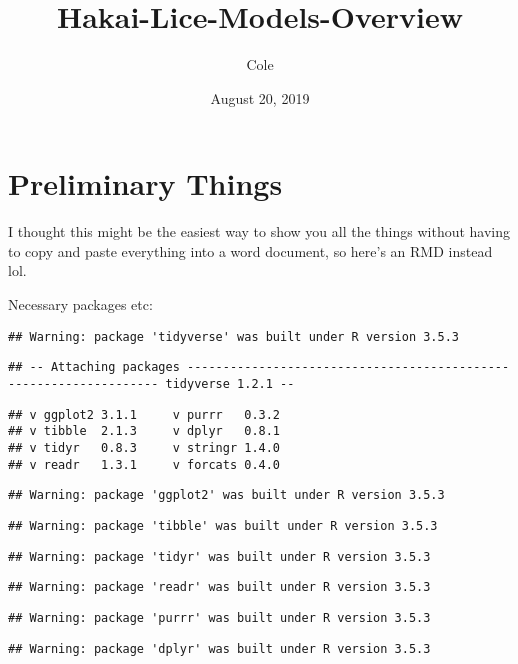 \documentclass[]{article}
\title{Hakai-Lice-Models-Overview}
\author{Cole}
\date{August 20, 2019}
\begin{document}
\maketitle

\section{Preliminary Things}\label{preliminary-things}

I thought this might be the easiest way to show you all the things
without having to copy and paste everything into a word document, so
here's an RMD instead lol.

Necessary packages etc:

\begin{verbatim}
## Warning: package 'tidyverse' was built under R version 3.5.3
\end{verbatim}

\begin{verbatim}
## -- Attaching packages ------------------------------------------------------------------ tidyverse 1.2.1 --
\end{verbatim}

\begin{verbatim}
## v ggplot2 3.1.1     v purrr   0.3.2
## v tibble  2.1.3     v dplyr   0.8.1
## v tidyr   0.8.3     v stringr 1.4.0
## v readr   1.3.1     v forcats 0.4.0
\end{verbatim}

\begin{verbatim}
## Warning: package 'ggplot2' was built under R version 3.5.3
\end{verbatim}

\begin{verbatim}
## Warning: package 'tibble' was built under R version 3.5.3
\end{verbatim}

\begin{verbatim}
## Warning: package 'tidyr' was built under R version 3.5.3
\end{verbatim}

\begin{verbatim}
## Warning: package 'readr' was built under R version 3.5.3
\end{verbatim}

\begin{verbatim}
## Warning: package 'purrr' was built under R version 3.5.3
\end{verbatim}

\begin{verbatim}
## Warning: package 'dplyr' was built under R version 3.5.3
\end{verbatim}
\end{document}
